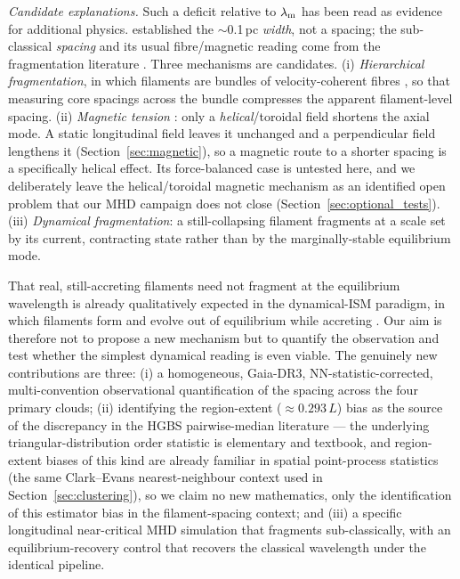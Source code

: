 \documentclass[usenatbib,twoside,twocolumn]{mnras}
\begin{document}
\emph{Candidate explanations.} Such a deficit relative to $\lambda_{\rm m}$ has been read as evidence for additional physics. \citet{Arzoumanian2019} established the $\sim$0.1\,pc \emph{width}, not a spacing; the sub-classical \emph{spacing} and its usual fibre/magnetic reading come from the fragmentation literature \citep{Fischera2012,Zhang2023cal}. Three mechanisms are candidates. (i) \emph{Hierarchical fragmentation}, in which filaments are bundles of velocity-coherent fibres \citep{Hacar2013,Hacar2018,Yang2024}, so that measuring core spacings across the bundle compresses the apparent filament-level spacing. (ii) \emph{Magnetic tension} \citep{Nakamura1993}: only a \emph{helical}/toroidal field shortens the axial mode. A static longitudinal field leaves it unchanged and a perpendicular field lengthens it (Section~\ref{sec:magnetic}), so a magnetic route to a shorter spacing is a specifically helical effect. Its force-balanced case is untested here, and we deliberately leave the helical/toroidal magnetic mechanism as an identified open problem that our MHD campaign does not close (Section~\ref{sec:optional_tests}). (iii) \emph{Dynamical fragmentation}: a still-collapsing filament fragments at a scale set by its current, contracting state rather than by the marginally-stable equilibrium mode.

That real, still-accreting filaments need not fragment at the equilibrium wavelength is already qualitatively expected in the dynamical-ISM paradigm, in which filaments form and evolve out of equilibrium while accreting \citep{Andre2014,Clarke2016,Clarke2017,Clarke2020}. Our aim is therefore not to propose a new mechanism but to quantify the observation and test whether the simplest dynamical reading is even viable. The genuinely new contributions are three: (i) a homogeneous, Gaia-DR3, NN-statistic-corrected, multi-convention observational quantification of the spacing across the four primary clouds; (ii) identifying the region-extent ($\approx0.293\,L$) bias as the source of the discrepancy in the HGBS pairwise-median literature --- the underlying triangular-distribution order statistic is elementary and textbook, and region-extent biases of this kind are already familiar in spatial point-process statistics (the same Clark--Evans nearest-neighbour context used in Section~\ref{sec:clustering}), so we claim no new mathematics, only the identification of this estimator bias in the filament-spacing context; and (iii) a specific longitudinal near-critical MHD simulation that fragments sub-classically, with an equilibrium-recovery control that recovers the classical wavelength under the identical pipeline.
\end{document}

